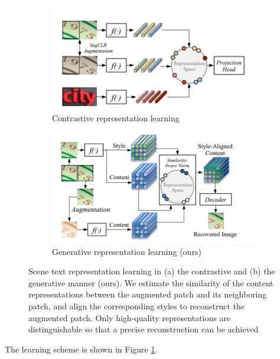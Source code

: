 \documentclass{article}
\begin{document}
\begin{multicols}{2}
\begin{figure}[H]
     \centering
     \begin{subfigure}[t]{0.5\textwidth}
         \centering
         \includegraphics[width= \textwidth]{1.png}
         \caption{Contrastive representation learning}
         \label{fig:Figure_1}
     \end{subfigure}
     \begin{subfigure}[t]{0.5\textwidth}
         \centering
         \includegraphics[width=\textwidth]{2.png}
         \caption{Generative representation learning (ours) }
         \label{fig:Figure_2}
     \end{subfigure}
    

        \caption{Scene text representation learning in (a) the contrastive
and (b) the generative manner (ours). We estimate the similarity
of the content representations between the augmented patch and
its neighboring patch, and align the corresponding styles to reconstruct the augmented patch. Only high-quality representations are
distinguishable so that a precise reconstruction can be achieved}
        \label{fig:whole_1}

\end{figure}
 The learning scheme is shown in Figure \ref{fig:Figure_1}.


\end{multicols}
\end{document}
